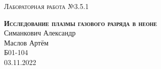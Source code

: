 \documentclass[12pt,a4paper]{extreport}
\begin{document}
	
	\begin{center}
		\large
		\textsc{Лабораторная работа №3.5.1}
		
		\LARGE
		\textbf{\textsc{Исследование плазмы газового разряда в неоне}}
		\\[5mm]
		
		\large
		Симанкович Александр\\
		Маслов Артём\\
		Б01-104
		\\[3mm]
		03.11.2022
	\end{center}
	
	
	
	
	
	
	
	
	
	
	
	
	
	
	
\end{document}
